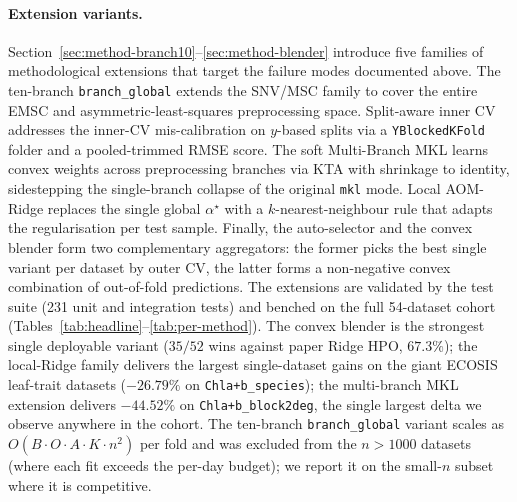 \documentclass[11pt,a4paper]{article}
\begin{document}
\paragraph{Extension variants.}
Section~\ref{sec:method-branch10}--\ref{sec:method-blender} introduce
five families of methodological extensions that target the failure
modes documented above. The ten-branch \texttt{branch\_global}
extends the SNV/MSC family to cover the entire EMSC and
asymmetric-least-squares preprocessing space. Split-aware inner CV
addresses the inner-CV mis-calibration on $y$-based splits via a
\texttt{YBlockedKFold} folder and a pooled-trimmed RMSE score. The
soft Multi-Branch MKL learns convex weights across preprocessing
branches via KTA with shrinkage to identity, sidestepping the
single-branch collapse of the original \texttt{mkl} mode. Local
AOM-Ridge replaces the single global $\alpha^\star$ with a
$k$-nearest-neighbour rule that adapts the regularisation per test
sample. Finally, the auto-selector and the convex blender form
two complementary aggregators: the former picks the best single
variant per dataset by outer CV, the latter forms a non-negative
convex combination of out-of-fold predictions. The
extensions are validated by the test suite (231 unit and integration
tests) and benched on the full 54-dataset cohort
(Tables~\ref{tab:headline}--\ref{tab:per-method}). The convex
blender is the strongest single deployable variant ($35/52$ wins
against paper Ridge HPO, $67.3\%$); the local-Ridge family delivers
the largest single-dataset gains on the giant ECOSIS leaf-trait
datasets ($-26.79\%$ on \texttt{Chla+b\_species}); the multi-branch
MKL extension delivers $-44.52\%$ on \texttt{Chla+b\_block2deg}, the
single largest delta we observe anywhere in the cohort. The
ten-branch \texttt{branch\_global} variant scales as $O(B \cdot O
\cdot A \cdot K \cdot n^2)$ per fold and was excluded from the
$n>1000$ datasets (where each fit exceeds the per-day budget); we
report it on the small-$n$ subset where it is competitive.
\end{document}
